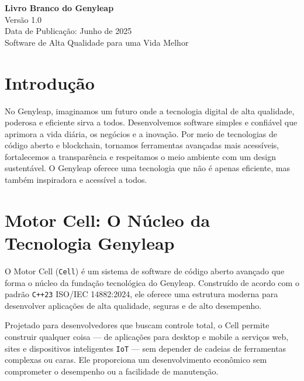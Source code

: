 \documentclass[a4paper,12pt,openany]{book}
\begin{document}
\begin{titlepage}
    \begin{center}
        \vspace*{1.5cm}
        {\Huge \textbf{Livro Branco do Genyleap}} \\
        \vspace{0.5cm}
        {\Large Versão 1.0} \\
        \vspace{0.5cm}
        {\large Data de Publicação: Junho de 2025} \\
        \vspace{1.5cm}
        {\large Software de Alta Qualidade para uma Vida Melhor} \\
    \end{center}
    \vfill
\end{titlepage}

\chapter{Introdução}
No Genyleap, imaginamos um futuro onde a tecnologia digital de alta qualidade, poderosa e eficiente sirva a todos. Desenvolvemos software simples e confiável que aprimora a vida diária, os negócios e a inovação. Por meio de tecnologias de código aberto e blockchain, tornamos ferramentas avançadas mais acessíveis, fortalecemos a transparência e respeitamos o meio ambiente com um design sustentável. O Genyleap oferece uma tecnologia que não é apenas eficiente, mas também inspiradora e acessível a todos.

\chapter{Motor Cell: O Núcleo da Tecnologia Genyleap}

O Motor Cell (\texttt{Cell}) é um sistema de software de código aberto avançado que forma o núcleo da fundação tecnológica do Genyleap. Construído de acordo com o padrão \texttt{C++23} ISO/IEC 14882:2024, ele oferece uma estrutura moderna para desenvolver aplicações de alta qualidade, seguras e de alto desempenho.

Projetado para desenvolvedores que buscam controle total, o Cell permite construir qualquer coisa — de aplicações para desktop e mobile a serviços web, sites e dispositivos inteligentes \texttt{IoT} — sem depender de cadeias de ferramentas complexas ou caras. Ele proporciona um desenvolvimento econômico sem comprometer o desempenho ou a facilidade de manutenção.
\end{document}
